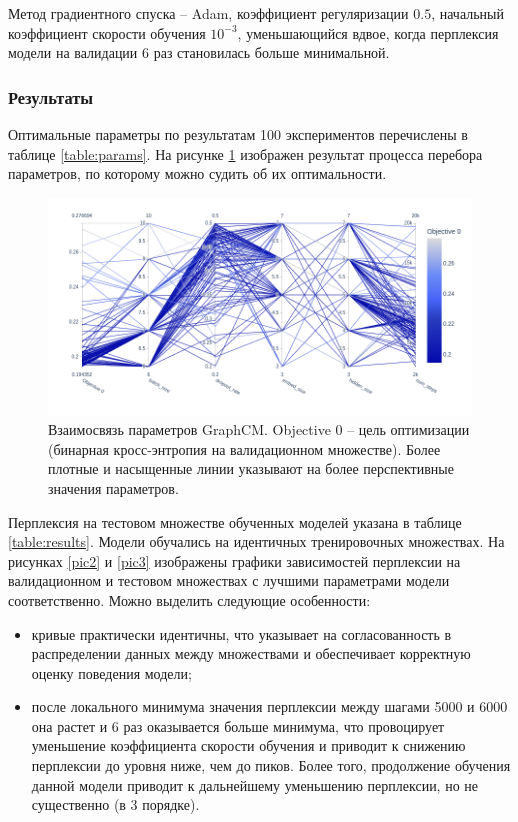 \documentclass[diploma]{nanolab2015}
\begin{document}
Метод градиентного спуска -- Adam, коэффициент регуляризации $0.5$, начальный коэффициент скорости обучения $10^{-3}$, уменьшающийся вдвое, когда перплексия модели на валидации 6 раз становилась больше минимальной.
\subsubsection{Результаты}
Оптимальные параметры по результатам 100 экспериментов перечислены в таблице \ref{table:params}. На рисунке \ref{pic1} изображен результат процесса перебора параметров, по которому можно судить об их оптимальности.

\begin{figure}[t]
    \includegraphics[scale=0.55]{./assets/optuna-params.png}
    \caption{Взаимосвязь параметров GraphCM. Objective 0 -- цель оптимизации (бинарная кросс-энтропия на валидационном множестве). Более плотные и насыщенные линии указывают на более перспективные значения параметров.}
    \label{pic1}
\end{figure}

Перплексия на тестовом множестве обученных моделей указана в таблице \ref{table:results}. Модели обучались на идентичных тренировочных множествах. На рисунках \ref{pic2} и \ref{pic3} изображены графики зависимостей перплексии на валидационном и тестовом множествах с лучшими параметрами модели соответственно. Можно выделить следующие особенности:
\begin{itemize}
    \item кривые практически идентичны, что указывает на согласованность в распределении данных между множествами и обеспечивает корректную оценку поведения модели;
    \item после локального минимума значения перплексии между шагами 5000 и 6000 она растет и 6 раз оказывается больше минимума, что провоцирует уменьшение коэффициента скорости обучения и приводит к снижению перплексии до уровня ниже, чем до пиков. Более того, продолжение обучения данной модели приводит к дальнейшему уменьшению перплексии, но не существенно (в 3 порядке).
\end{itemize}
\end{document}
